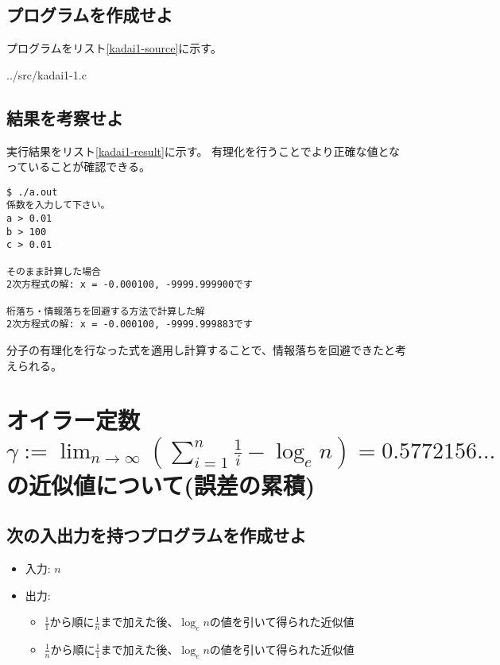 \documentclass[]{jsarticle}
\begin{document}
\subsection{プログラムを作成せよ}

プログラムをリスト\ref{kadai1-source}に示す。


{../src/kadai1-1.c}


\subsection{結果を考察せよ}

実行結果をリスト\ref{kadai1-result}に示す。
有理化を行うことでより正確な値となっていることが確認できる。

\begin{lstlisting}[caption=実行結果,label=kadai1-result]
$ ./a.out
係数を入力して下さい。
a > 0.01
b > 100
c > 0.01

そのまま計算した場合
2次方程式の解: x = -0.000100, -9999.999900です

桁落ち・情報落ちを回避する方法で計算した解
2次方程式の解: x = -0.000100, -9999.999883です
\end{lstlisting}

分子の有理化を行なった式を適用し計算することで、情報落ちを回避できたと考えられる。


\section{オイラー定数$\gamma:=\lim_{n \to \infty} \left(\sum_{i=1}^{n} \frac{1}{i} - \log_{e} n\right)=0.5772156...$の近似値について(誤差の累積)}

\subsection{次の入出力を持つプログラムを作成せよ}

\begin{itemize}
\item 入力: $n$
\item 出力:
\begin{itemize}
\item $\frac{1}{1}$から順に$\frac{1}{n}$まで加えた後、$\log_{e} n$の値を引いて得られた近似値
\item $\frac{1}{n}$から順に$\frac{1}{1}$まで加えた後、$\log_{e} n$の値を引いて得られた近似値
\end{itemize}
\end{itemize}
\end{document}
